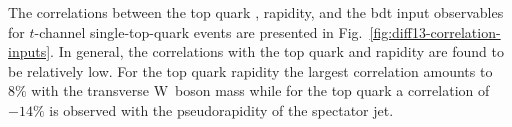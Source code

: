 {
\hspace{0.02\textwidth}
}

The correlations between the top quark \pt, rapidity, and the \gls{bdt} input observables for $t$-channel single-top-quark events are presented in Fig.~\ref{fig:diff13-correlation-inputs}. In general, the correlations with the top quark \pt and rapidity are found to be relatively low. For the top quark rapidity the largest correlation amounts to $8\%$ with the transverse W~boson mass while for the top quark \pt a correlation of $-14\%$ is observed with the pseudorapidity of the spectator jet.



